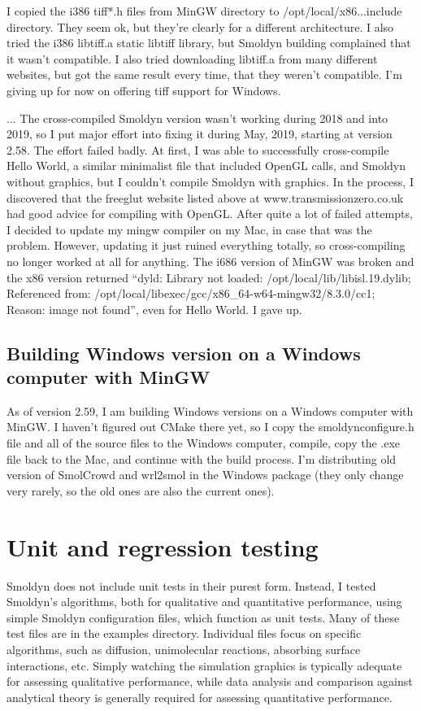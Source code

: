\documentclass {book}
\begin{document}
I copied the i386 tiff*.h files from MinGW directory to /opt/local/x86...include directory. They seem ok, but they're clearly for a different architecture. I also tried the i386 libtiff.a static libtiff library, but Smoldyn building complained that it wasn't compatible. I also tried downloading libtiff.a from many different websites, but got the same result every time, that they weren't compatible. I'm giving up for now on offering tiff support for Windows.

... The cross-compiled Smoldyn version wasn't working during 2018 and into 2019, so I put major effort into fixing it during May, 2019, starting at version 2.58. The effort failed badly. At first, I was able to successfully cross-compile Hello World, a similar minimalist file that included OpenGL calls, and Smoldyn without graphics, but I couldn't compile Smoldyn with graphics. In the process, I discovered that the freeglut website listed above at www.transmissionzero.co.uk had good advice for compiling with OpenGL. After quite a lot of failed attempts, I decided to update my mingw compiler on my Mac, in case that was the problem. However, updating it just ruined everything totally, so cross-compiling no longer worked at all for anything. The i686 version of MinGW was broken and the x86 version returned ``dyld: Library not loaded: /opt/local/lib/libisl.19.dylib; Referenced from: /opt/local/libexec/gcc/x86\_64-w64-mingw32/8.3.0/cc1; Reason: image not found'', even for Hello World. I gave up.

\subsection{Building Windows version on a Windows computer with MinGW}

As of version 2.59, I am building Windows versions on a Windows computer with MinGW. I haven't figured out CMake there yet, so I copy the smoldynconfigure.h file and all of the source files to the Windows computer, compile, copy the .exe file back to the Mac, and continue with the build process. I'm distributing old version of SmolCrowd and wrl2smol in the Windows package (they only change very rarely, so the old ones are also the current ones).

\section{Unit and regression testing}

Smoldyn does not include unit tests in their purest form. Instead, I tested Smoldyn's algorithms, both for qualitative and quantitative performance, using simple Smoldyn configuration files, which function as unit tests. Many of these test files are in the examples directory. Individual files focus on specific algorithms, such as diffusion, unimolecular reactions, absorbing surface interactions, etc. Simply watching the simulation graphics is typically adequate for assessing qualitative performance, while data analysis and comparison against analytical theory is generally required for assessing quantitative performance.
\end{document}
